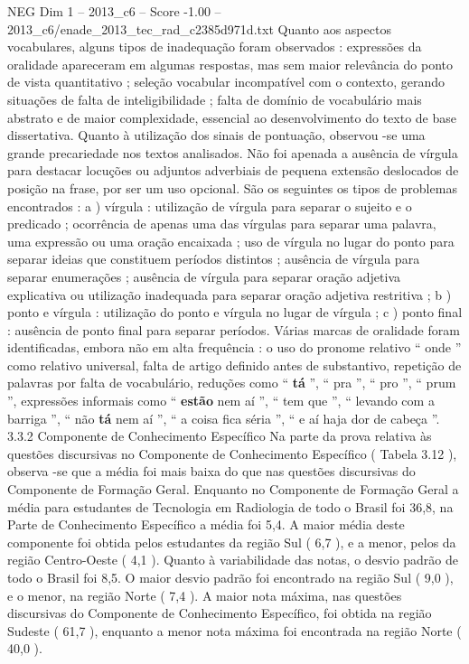 \begin{textsample}{NEG Dim 1 – 2013\_c6 – Score -1.00 – 2013\_c6/enade\_2013\_tec\_rad\_c2385d971d.txt}
Quanto aos aspectos vocabulares, alguns tipos de inadequação foram observados : expressões da oralidade apareceram em algumas respostas, mas sem maior relevância do ponto de vista quantitativo ; seleção vocabular incompatível com o contexto, gerando situações de falta de inteligibilidade ; falta de domínio de vocabulário mais abstrato e de maior complexidade, essencial ao desenvolvimento do texto de base dissertativa.
Quanto à utilização dos sinais de pontuação, observou -se uma grande precariedade nos textos analisados.
Não foi apenada a ausência de vírgula para destacar locuções ou adjuntos adverbiais de pequena extensão deslocados de posição na frase, por ser um uso opcional.
São os seguintes os tipos de problemas encontrados : a ) vírgula : utilização de vírgula para separar o sujeito e o predicado ; ocorrência de apenas uma das vírgulas para separar uma palavra, uma expressão ou uma oração encaixada ; uso de vírgula no lugar do ponto para separar ideias que constituem períodos distintos ; ausência de vírgula para separar enumerações ; ausência de vírgula para separar oração adjetiva explicativa ou utilização inadequada para separar oração adjetiva restritiva ; b ) ponto e vírgula : utilização do ponto e vírgula no lugar de vírgula ; c ) ponto final : ausência de ponto final para separar períodos.
Várias marcas de oralidade foram identificadas, embora não em alta frequência : o uso do pronome relativo “ onde ” como relativo universal, falta de artigo definido antes de substantivo, repetição de palavras por falta de vocabulário, reduções como “ \textbf{tá} ”, “ pra ”, “ pro ”, “ prum ”, expressões informais como “ \textbf{estão} nem aí ”, “ tem que ”, “ levando com a barriga ”, “ não \textbf{tá} nem aí ”, “ a coisa fica séria ”, “ e aí haja dor de cabeça ”. 3.3.2 Componente de Conhecimento Específico Na parte da prova relativa às questões discursivas no Componente de Conhecimento Específico ( Tabela 3.12 ), observa -se que a média foi mais baixa do que nas questões discursivas do Componente de Formação Geral.
Enquanto no Componente de Formação Geral a média para estudantes de Tecnologia em Radiologia de todo o Brasil foi 36,8, na Parte de Conhecimento Específico a média foi 5,4.
A maior média deste componente foi obtida pelos estudantes da região Sul ( 6,7 ), e a menor, pelos da região Centro-Oeste ( 4,1 ).
Quanto à variabilidade das notas, o desvio padrão de todo o Brasil foi 8,5.
O maior desvio padrão foi encontrado na região Sul ( 9,0 ), e o menor, na região Norte ( 7,4 ).
A maior nota máxima, nas questões discursivas do Componente de Conhecimento Específico, foi obtida na região Sudeste ( 61,7 ), enquanto a menor nota máxima foi encontrada na região Norte ( 40,0 ).

\end{textsample}
